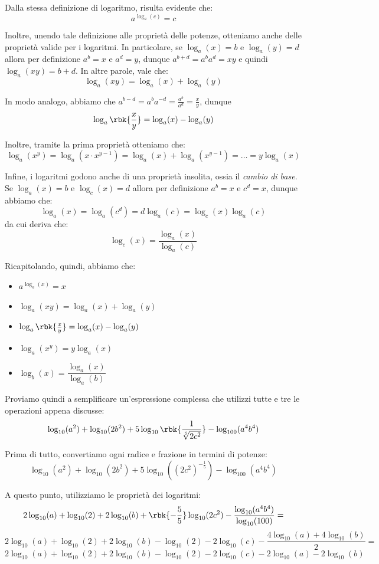 \documentclass[a4paper, 12pt]{report}
\begin{document}
    Dalla stessa definizione di logaritmo, risulta evidente che:
    \[a^{\log_a(c)} = c\]

    Inoltre, unendo tale definizione alle proprietà delle potenze, otteniamo anche delle proprietà valide per i logaritmi. In particolare, se $\log_{a}(x) = b$ e $\log_{a}(y) = d$ allora per definizione $a^b = x$ e $a^d = y$, dunque $a^{b+d} = a^b a^d = xy$ e quindi $\log_a(xy) = b+d$. In altre parole, vale che:
    \[\log_a(xy) = \log_a(x) + \log_a(y)\]

    In modo analogo, abbiamo che $a^{b-d} = a^{b} a^{-d} = \frac{a^b}{a^d} = \frac{x}{y}$, dunque
    \[\log_a \rbk{\frac{x}{y}} = \log_a(x) - \log_a(y)\]

    Inoltre, tramite la prima proprietà otteniamo che:
    \[\log_a(x^y) = \log_a(x \cdot x^{y-1}) = \log_a(x) + \log_a(x^{y-1}) = \ldots = y \log_a(x)\]

    Infine, i logaritmi godono anche di una proprietà insolita, ossia il \textit{cambio di base}. Se $\log_{a}(x) = b$ e $\log_{c}(x) = d$ allora per definizione $a^b = x$ e $c^d = x$, dunque abbiamo che:
    \[\log_a(x) = \log_a(c^d) = d \log_a(c) = \log_c(x) \log_a(c)\]
    da cui deriva che:
    \[\log_c(x) = \frac{\log_a(x)}{\log_a(c)}\]

    Ricapitolando, quindi, abbiamo che:
    \begin{itemize}
        \item $a^{\log_a(x)} = x$
        \item $\log_a(xy) = \log_a(x) + \log_a(y)$
        \item $\log_a \rbk{\frac{x}{y}} = \log_a(x) - \log_a(y)$
        \item $\log_a(x^y) = y \log_a(x)$
        \item $\log_b(x) = \dfrac{\log_a(x)}{\log_a(b)}$
    \end{itemize}
    
    \quad

    Proviamo quindi a semplificare un'espressione complessa che utilizzi tutte e tre le operazioni appena discusse:
    \[\log_{10}(a^2) + \log_{10}(2b^2) + 5 \log_{10} \rbk{\frac{1}{\sqrt[5]{2c^2}}} - \log_{100} (a^4b^4)\]

    Prima di tutto, convertiamo ogni radice e frazione in termini di potenze:
    \[\log_{10}(a^2) + \log_{10}(2b^2) + 5 \log_{10} ((2c^2)^{-\frac{1}{5}}) - \log_{100} (a^4b^4)\]

    A questo punto, utilizziamo le proprietà dei logaritmi:
    \[2\log_{10}(a) + \log_{10}(2) + 2\log_{10}(b) + \rbk{-\frac{5}{5}} \log_{10} (2c^2) - \frac{\log_{10}(a^4b^4)}{\log_{10} (100)}=\]
    \[2\log_{10}(a) + \log_{10}(2) + 2\log_{10}(b) - \log_{10} (2) - 2\log_{10}(c) - \frac{4\log_{10}(a) + 4\log_{10}(b)}{2}=\]
    \[2\log_{10}(a) + \log_{10}(2) + 2\log_{10}(b) - \log_{10} (2) - 2\log_{10}(c) - 2\log_{10}(a) - 2\log_{10}(b)\]
\end{document}
